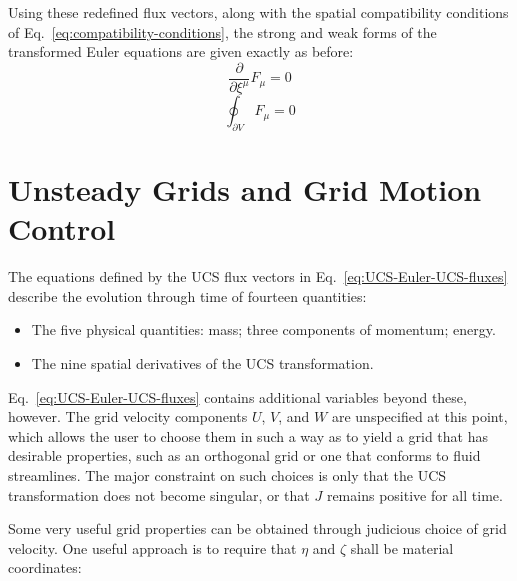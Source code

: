 Using these redefined flux vectors, along with the spatial compatibility conditions of Eq.~\ref{eq:compatibility-conditions}, the strong and weak forms of the transformed Euler equations are given exactly as before:
\[\frac{\partial }{{\partial {\xi ^\mu }}}{F_\mu } = 0\]
\[\oint_{\partial V} {{F_\mu }}  = 0\]
\section{Unsteady Grids and Grid Motion Control}
\label{sec:UCS-grid-motion}

The equations defined by the UCS flux vectors in Eq.~\ref{eq:UCS-Euler-UCS-fluxes} describe the evolution through time of fourteen quantities:
\begin{itemize}
\item The five physical quantities: mass; three components of momentum; energy.
\item The nine spatial derivatives of the UCS transformation.
\end{itemize}

Eq.~\ref{eq:UCS-Euler-UCS-fluxes} contains additional variables beyond these, however. The grid velocity components $U$, $V$, and $W$ are unspecified at this point, which allows the user to choose them in such a way as to yield a grid that has desirable properties, such as an orthogonal grid or one that conforms to fluid streamlines. The major constraint on such choices is only that the UCS transformation does not become singular, or that $J$ remains positive for all time. 

Some very useful grid properties can be obtained through judicious choice of grid velocity. One useful approach is to require that $\eta$ and $\zeta$ shall be material coordinates:

